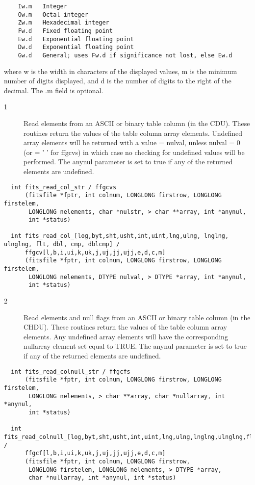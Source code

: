 \documentclass[11pt]{book}
\begin{document}
\begin{verbatim}
    Iw.m   Integer
    Ow.m   Octal integer
    Zw.m   Hexadecimal integer
    Fw.d   Fixed floating point
    Ew.d   Exponential floating point
    Dw.d   Exponential floating point
    Gw.d   General; uses Fw.d if significance not lost, else Ew.d
\end{verbatim}
    where w is the width in characters of the displayed values, m is
    the minimum number of digits displayed, and d is the number of
    digits to the right of the decimal.  The .m field is optional.


\begin{description}
\item[1 ] Read elements from an ASCII or binary table column (in the CDU).  These
    routines return the values of the table column array elements.  Undefined
    array elements will be returned with a value = nulval, unless nulval = 0
    (or = ' ' for ffgcvs) in which case no checking for undefined values will
    be performed. The anynul parameter is set to true if any of the returned
   elements are undefined. \label{ffgcvx}
\end{description}

\begin{verbatim}
  int fits_read_col_str / ffgcvs
      (fitsfile *fptr, int colnum, LONGLONG firstrow, LONGLONG firstelem,
       LONGLONG nelements, char *nulstr, > char **array, int *anynul,
       int *status)

  int fits_read_col_[log,byt,sht,usht,int,uint,lng,ulng, lnglng, ulnglng, flt, dbl, cmp, dblcmp] /
      ffgcv[l,b,i,ui,k,uk,j,uj,jj,ujj,e,d,c,m]
      (fitsfile *fptr, int colnum, LONGLONG firstrow, LONGLONG firstelem,
       LONGLONG nelements, DTYPE nulval, > DTYPE *array, int *anynul,
       int *status)
\end{verbatim}

\begin{description}
\item[2 ] Read elements and null flags from an ASCII or binary table column (in the
    CHDU).  These routines return the values of the table column array elements.
    Any undefined array elements will have the corresponding nullarray element
    set equal to TRUE.  The anynul parameter is set to true if any of the
   returned elements are undefined. \label{ffgcfx}
\end{description}

\begin{verbatim}
  int fits_read_colnull_str / ffgcfs
      (fitsfile *fptr, int colnum, LONGLONG firstrow, LONGLONG firstelem,
       LONGLONG nelements, > char **array, char *nullarray, int *anynul,
       int *status)

  int fits_read_colnull_[log,byt,sht,usht,int,uint,lng,ulng,lnglng,ulnglng,flt,dbl,cmp,dblcmp] /
      ffgcf[l,b,i,ui,k,uk,j,uj,jj,ujj,e,d,c,m]
      (fitsfile *fptr, int colnum, LONGLONG firstrow,
       LONGLONG firstelem, LONGLONG nelements, > DTYPE *array,
       char *nullarray, int *anynul, int *status)
\end{verbatim}
\end{document}
